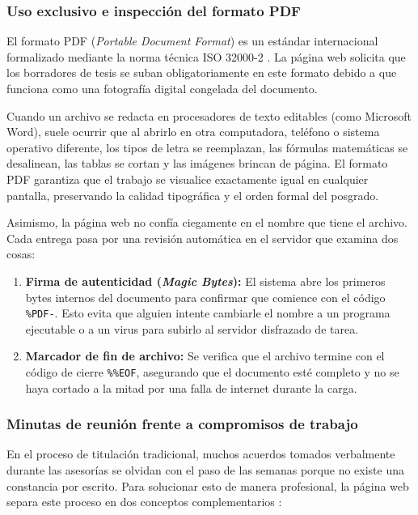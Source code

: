 \subsubsection{Uso exclusivo e inspección del formato PDF}
El formato PDF (\textit{Portable Document Format}) es un estándar internacional formalizado mediante la norma técnica ISO 32000-2 \parencite{iso32000}. La página web solicita que los borradores de tesis se suban obligatoriamente en este formato debido a que funciona como una fotografía digital congelada del documento. 

Cuando un archivo se redacta en procesadores de texto editables (como Microsoft Word), suele ocurrir que al abrirlo en otra computadora, teléfono o sistema operativo diferente, los tipos de letra se reemplazan, las fórmulas matemáticas se desalinean, las tablas se cortan y las imágenes brincan de página. El formato PDF garantiza que el trabajo se visualice exactamente igual en cualquier pantalla, preservando la calidad tipográfica y el orden formal del posgrado.

Asimismo, la página web no confía ciegamente en el nombre que tiene el archivo. Cada entrega pasa por una revisión automática en el servidor que examina dos cosas:
\begin{enumerate}
    \item \textbf{Firma de autenticidad (\textit{Magic Bytes}):} El sistema abre los primeros bytes internos del documento para confirmar que comience con el código \texttt{\%PDF-}. Esto evita que alguien intente cambiarle el nombre a un programa ejecutable o a un virus para subirlo al servidor disfrazado de tarea.
    \item \textbf{Marcador de fin de archivo:} Se verifica que el archivo termine con el código de cierre \texttt{\%\%EOF}, asegurando que el documento esté completo y no se haya cortado a la mitad por una falla de internet durante la carga.
\end{enumerate}

\subsubsection{Minutas de reunión frente a compromisos de trabajo}
En el proceso de titulación tradicional, muchos acuerdos tomados verbalmente durante las asesorías se olvidan con el paso de las semanas porque no existe una constancia por escrito. Para solucionar esto de manera profesional, la página web separa este proceso en dos conceptos complementarios \parencite{pmi2021}:


